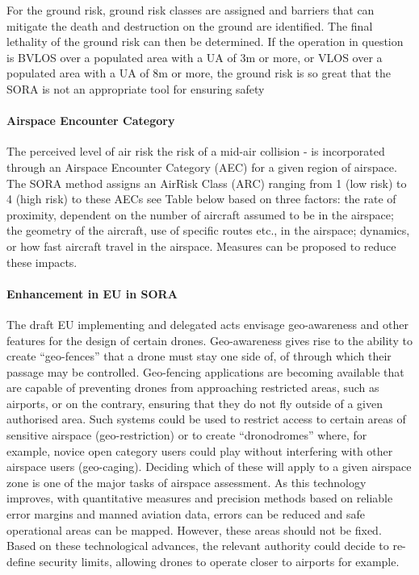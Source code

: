 \documentclass{ua_wgs_base}
\begin{document}
For the ground risk, ground risk classes are assigned and barriers
that can mitigate the death and destruction on the ground are identified.
The final lethality of the ground risk can then be determined. If
the operation in question is BVLOS over a populated area with a UA
of 3m or more, or VLOS over a populated area with a UA of 8m or more,
the ground risk is so great that the SORA is not an appropriate tool
for ensuring safety

\paragraph{Airspace Encounter Category}

The perceived level of air risk \textendash{} the risk of a mid-air
collision - is incorporated through an Airspace Encounter Category
(AEC) for a given region of airspace. The SORA method assigns an AirRisk
Class (ARC) ranging from 1 (low risk) to 4 (high risk) to these AECs
\textendash{} see Table below \textendash{} based on three factors:
the rate of proximity, dependent on the number of aircraft assumed
to be in the airspace; the geometry of the aircraft, use of specific
routes etc., in the airspace; dynamics, or how fast aircraft travel
in the airspace. Measures can be proposed to reduce these impacts.

\paragraph{Enhancement in EU in SORA}

The draft EU implementing and delegated acts envisage geo-awareness
and other features for the design of certain drones. Geo-awareness
gives rise to the ability to create \textquotedblleft geo-fences\textquotedblright{}
that a drone must stay one side of, of through which their passage
may be controlled. Geo-fencing applications are becoming available
that are capable of preventing drones from approaching restricted
areas, such as airports, or on the contrary, ensuring that they do
not fly outside of a given authorised area. Such systems could be
used to restrict access to certain areas of sensitive airspace (geo-restriction)
or to create \textquotedblleft dronodromes\textquotedblright{} where,
for example, novice open category users could play without interfering
with other airspace users (geo-caging). Deciding which of these will
apply to a given airspace zone is one of the major tasks of airspace
assessment. As this technology improves, with quantitative measures
and precision methods based on reliable error margins and manned aviation
data, errors can be reduced and safe operational areas can be mapped.
However, these areas should not be fixed. Based on these technological
advances, the relevant authority could decide to re-define security
limits, allowing drones to operate closer to airports for example.
\end{document}
